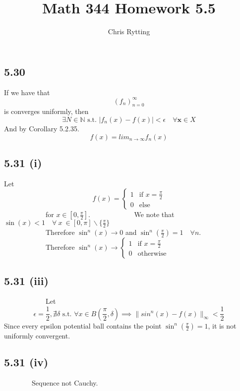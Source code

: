 \documentclass[letterpaper,12pt]{article}
\theoremstyle{definition}
\begin{document}
\title{Math 344 Homework 5.5}
\author{Chris Rytting}
\maketitle

\subsection*{5.30}


If we have that 
\[(f_n)_{n=0}^\infty\] is converges uniformly, then \[\exists N \in \mathbb{N} \text{ s.t. } |f_n(x) - f(x)| < \epsilon \quad \forall \mathbf{x} \in X\]
And by Corollary 5.2.35. 
\[f(x) = lim_{n\to \infty} f_n(x)\]
\subsection*{5.31 (i)}


Let
        \[
            f(x) = 
            \begin{cases}
                1 & \text{if } x = \frac{\pi}{2}\\
                0 & \text{else }
            \end{cases}
            \]
            for $x\in[0,\frac{\pi}{2}]$.
            We note that $\sin(x) < 1 \quad \forall ~x~ \in [0,\pi]\smallsetminus \{\frac{\pi}{2}\}$\\
            Therefore $\sin^n(x) \to 0$ and $\sin^n(\frac{\pi}{2})=1 \quad \forall n$.\\
            Therefore $\sin^n(x) \to \begin{cases} 
                1 & \text{if } x = \frac{\pi}{2}\\
                0 & \text{otherwise }
            \end{cases}$

\subsection*{5.31 (iii)}
            Let 
\[\epsilon = \frac{1}{2}, \nexists \delta \text{ s.t. } \forall x \in B(\frac{\pi}{2}, \delta) \implies \|sin^n(x) - f(x)\|_\infty < \frac{1}{2}\] Since every epsilon potential ball contains the point $\sin^n(\frac{\pi}{2}) = 1$, it is not uniformly convergent.

\subsection*{5.31 (iv)}
        Sequence not Cauchy.
\end{document}
